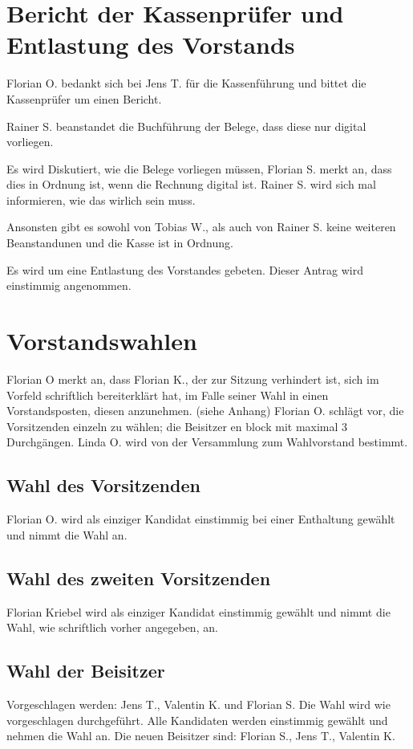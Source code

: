 \section{Bericht der Kassenprüfer und Entlastung des Vorstands}
Florian O. bedankt sich bei Jens T. für die Kassenführung und bittet die Kassenprüfer um einen Bericht.

Rainer S. beanstandet die Buchführung der Belege, dass diese nur digital vorliegen.

Es wird Diskutiert, wie die Belege vorliegen müssen, Florian S. merkt an, dass dies in Ordnung ist, wenn die Rechnung digital ist. Rainer S. wird sich mal informieren, wie das wirlich sein muss.

Ansonsten gibt es sowohl von Tobias W., als auch von Rainer S. keine weiteren Beanstandunen und die Kasse ist in Ordnung.

Es wird um eine Entlastung des Vorstandes gebeten.
Dieser Antrag wird einstimmig angenommen.

\section{Vorstandswahlen}
 Florian O merkt an, dass Florian K., der zur Sitzung verhindert ist, sich im Vorfeld schriftlich bereiterklärt hat, im Falle seiner Wahl in einen Vorstandsposten, diesen anzunehmen. (siehe Anhang)
 Florian O. schlägt vor, die Vorsitzenden einzeln zu wählen; die Beisitzer en block mit maximal 3 Durchgängen.
 Linda O. wird von der Versammlung zum Wahlvorstand bestimmt.
\subsection{Wahl des Vorsitzenden}
 Florian O. wird als einziger Kandidat einstimmig bei einer Enthaltung gewählt und nimmt die Wahl an. 
\subsection{Wahl des zweiten Vorsitzenden}         
 Florian Kriebel wird als einziger Kandidat einstimmig gewählt und nimmt die Wahl, wie schriftlich vorher angegeben, an. 
\subsection{Wahl der Beisitzer}
  Vorgeschlagen werden: Jens T., Valentin K. und Florian S.
  Die Wahl wird wie vorgeschlagen durchgeführt. 
  Alle Kandidaten werden einstimmig gewählt und nehmen die Wahl an. 
  Die neuen Beisitzer sind: Florian S., Jens T., Valentin K.

